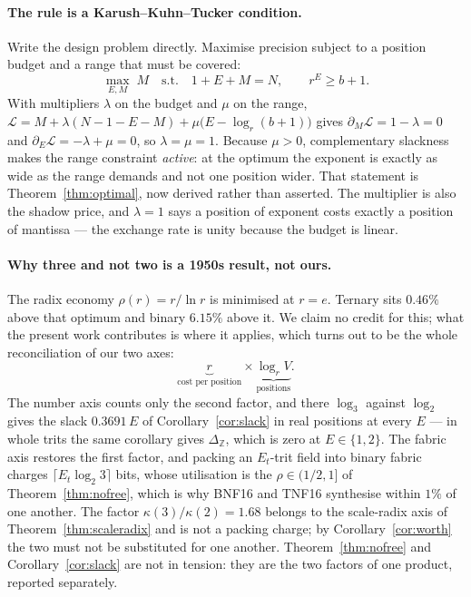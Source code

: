 \paragraph{The rule is a Karush--Kuhn--Tucker condition.} Write the design problem
directly. Maximise precision subject to a position budget and a range that must be
covered:
\[
  \max_{E,M} \; M
  \quad\text{s.t.}\quad
  1 + E + M = N,
  \qquad
  r^{E} \ge b+1 .
\]
With multipliers $\lambda$ on the budget and $\mu$ on the range,
$\mathcal{L} = M + \lambda(N-1-E-M) + \mu\bigl(E - \log_r(b+1)\bigr)$ gives
$\partial_M \mathcal{L} = 1-\lambda = 0$ and $\partial_E \mathcal{L} = -\lambda+\mu = 0$,
so $\lambda = \mu = 1$. Because $\mu > 0$, complementary slackness makes the range
constraint \emph{active}: at the optimum the exponent is exactly as wide as the
range demands and not one position wider. That statement is
Theorem~\ref{thm:optimal}, now derived rather than asserted. The multiplier is
also the shadow price, and $\lambda = 1$ says a position of exponent costs exactly
a position of mantissa --- the exchange rate is unity because the budget is linear.

\paragraph{Why three and not two is a 1950s result, not ours.} The radix economy
$\rho(r) = r/\ln r$ is minimised at $r = e$. Ternary sits $0.46\%$ above that
optimum and binary $6.15\%$ above it. We claim no credit for this; what the present
work contributes is where it applies, which turns out to be the whole
reconciliation of our two axes:
\[
  \underbrace{r}_{\text{cost per position}} \times \underbrace{\log_r V}_{\text{positions}} .
\]
The number axis counts only the second factor, and there $\log_3$ against $\log_2$
gives the slack $0.3691\,E$ of Corollary~\ref{cor:slack} in real positions at every
$E$ --- in whole trits the same corollary gives $\Delta_{\mathbb{Z}}$, which is
zero at $E \in \{1,2\}$. The fabric axis restores the first factor, and packing an
$E_t$-trit field into binary fabric charges $\lceil E_t\log_2 3\rceil$ bits, whose
utilisation is the $\rho \in (1/2,1]$ of Theorem~\ref{thm:nofree}, which is why
BNF16 and TNF16 synthesise within $1\%$ of one another. The factor
$\kappa(3)/\kappa(2) = 1.68$ belongs to the scale-radix axis of
Theorem~\ref{thm:scaleradix} and is not a packing charge; by
Corollary~\ref{cor:worth} the two must not be substituted for one another. Theorem~\ref{thm:nofree} and
Corollary~\ref{cor:slack} are not in tension: they are the two factors of one
product, reported separately.


